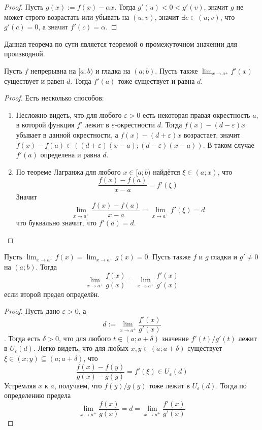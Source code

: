 \documentclass[12pt,a4paper]{article}
\begin{document}
    \begin{proof}
        Пусть $g(x) := f(x) - \alpha x$. Тогда $g'(u) < 0 < g'(v)$, значит $g$ не может строго возрастать или убывать на $(u; v)$, значит $\exists c \in (u; v)$, что $g'(c) = 0$, а значит $f'(c)=\alpha$.
    \end{proof}

    \begin{remark}
        Данная теорема по сути является теоремой о промежуточном значении для производной.
    \end{remark}

    \begin{theorem}
        Пусть $f$ непрерывна на $[a; b)$ и гладка на $(a; b)$. Пусть также $\lim_{x \to a^+} f'(x)$ существует и равен $d$. Тогда $f'(a)$ тоже существует и равна $d$.
    \end{theorem}

    \begin{proof}
        Есть несколько способов:
        \begin{enumerate}
            \item Несложно видеть, что для любого $\varepsilon > 0$ есть некоторая правая окрестность $a$, в которой функция $f'$ лежит в $\varepsilon$-окрестности $d$. Тогда $f(x) - (d-\varepsilon)x$ убывает в данной окрестности, а $f(x) - (d+\varepsilon)x$ возрастает, значит $f(x) - f(a) \in ((d + \varepsilon)(x-a); (d-\varepsilon)(x-a))$. В таком случае $f'(a)$ определена и равна $d$.
            \item По теореме Лагранжа для любого $x \in [a; b)$ найдётся $\xi \in (a; x)$, что
                \[\frac{f(x) - f(a)}{x - a} = f'(\xi)\]
                Значит
                \[\lim_{x \to a^+} \frac{f(x) - f(a)}{x - a} = \lim_{x \to a^+} f'(\xi) = d\]
                что буквально значит, что $f'(a) = d$.
        \end{enumerate}
    \end{proof}

    \begin{theorem}
        Пусть $\lim_{x \to a^+} f(x) = \lim_{x \to a^+} g(x) = 0$. Пусть также $f$ и $g$ гладки и $g' \neq 0$ на $(a; b)$. Тогда
        \[\lim_{x \to a^+} \frac{f(x)}{g(x)} = \lim_{x \to a^+} \frac{f'(x)}{g'(x)}\]
        если второй предел определён.
    \end{theorem}

    \begin{proof}
        Пусть дано $\varepsilon > 0$, а
        \[d := \lim_{x \to a^+} \frac{f'(x)}{g'(x)}\]. Тогда есть $\delta > 0$, что для любого $t \in (a; a + \delta)$ значение $f'(t)/g'(t)$ лежит в $U_\varepsilon(d)$. Легко видеть, что для любых $x, y \in (a; a + \delta)$ существует $\xi \in (x; y) \subseteq (a; a + \delta)$, что
        \[\frac{f(x) - f(y)}{g(x) - g(y)} = f'(\xi) \in U_\varepsilon(d)\]
        Устремляя $x$ к $a$, получаем, что $f(y)/g(y)$ тоже лежит в $U_\varepsilon(d)$. Тогда по определению предела
        \[\lim_{x \to a^+} \frac{f(x)}{g(x)} = d = \lim_{x \to a^+} \frac{f'(x)}{g'(x)}\]
    \end{proof}
\end{document}
